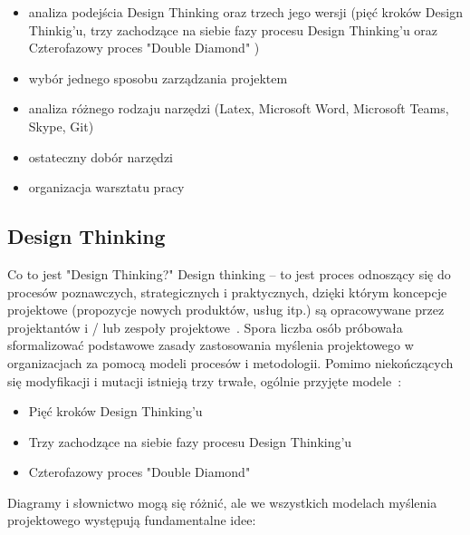 \documentclass[a4paper,titleauthor]{mwart}
\begin{document}
\begin{itemize}
	\item analiza podejścia Design Thinking oraz trzech jego wersji (pięć kroków Design Thinkig'u, trzy zachodzące na siebie fazy procesu Design Thinking'u oraz Czterofazowy proces "Double Diamond" )
	\item wybór jednego sposobu zarządzania projektem
	\item analiza różnego rodzaju narzędzi (Latex, Microsoft Word, Microsoft Teams, Skype, Git) 
	\item ostateczny dobór narzędzi
	\item organizacja warsztatu pracy
\end{itemize}

\subsection{Design Thinking}
\label{sec:design_thinking}
Co to jest "Design Thinking?" \newline
\newline
Design thinking – to jest proces odnoszący się do procesów poznawczych, strategicznych i praktycznych, dzięki którym koncepcje projektowe (propozycje nowych produktów, usług itp.) są opracowywane przez projektantów i / lub zespoły projektowe~\cite{DesignThinking1}. \newline \newline Spora liczba osób próbowała sformalizować podstawowe zasady zastosowania myślenia projektowego w organizacjach za pomocą modeli procesów i metodologii. Pomimo niekończących się modyfikacji i mutacji istnieją trzy trwałe, ogólnie przyjęte modele~\cite{DesignThinking2}:

 \begin{itemize}
 	\item Pięć kroków Design Thinking'u
 	\item Trzy zachodzące na siebie fazy procesu Design Thinking'u
 	\item Czterofazowy proces "Double Diamond" 
 \end{itemize}

Diagramy i słownictwo mogą się różnić, ale we wszystkich modelach myślenia projektowego występują fundamentalne idee:
\end{document}
